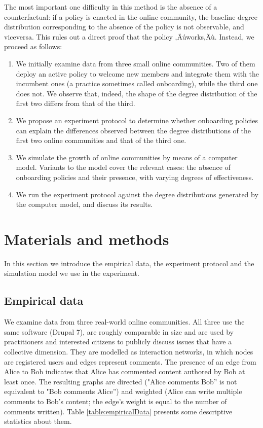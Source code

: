 \documentclass{nws}
\begin{document}
The most important one difficulty in this method is the absence of a counterfactual: if a policy is enacted in the online community, the baseline degree distribution corresponding to the absence of the policy is not observable, and viceversa. This rules out a direct proof that the policy ‚Äúworks‚Äù. Instead, we proceed as follows: 

\begin{enumerate}
\item We initially examine data from three small online communities. Two of them deploy an active policy to welcome new members and integrate them with the incumbent ones (a practice sometimes called onboarding), while the third one does not. We observe that, indeed, the shape of the degree distribution of the first two differs from that of the third.  
\item We propose an experiment protocol to determine whether onboarding policies can explain the differences observed between the degree distributions of the first two online communities and that of the third one. 
\item We simulate the growth of online communities by means of a computer model. Variants to the model cover the relevant cases: the absence of onboarding policies and their presence, with varying degrees of effectiveness. 
\item We run the experiment protocol against the degree distributions generated by the computer model, and discuss its results.
\end{enumerate}

\section{Materials and methods}

In this section we introduce the empirical data, the experiment protocol and the simulation model we use in the experiment. 

\subsection{Empirical data}
\label{sec:empirical_data}

We examine data from three real-world online communities. All three use the same software (Drupal 7), are roughly comparable in size and are used by practitioners and interested citizens to publicly discuss issues that have a collective dimension. They are modelled as interaction networks, in which nodes are registered users and edges represent comments. The presence of an edge from Alice to Bob indicates that Alice has commented content authored by Bob at least once. The resulting graphs are directed ("Alice comments Bob'' is not equivalent to "Bob comments Alice'') and weighted (Alice can write multiple comments to Bob's content; the edge's weight is equal to the number of comments written). Table \ref{table:empiricalData} presents some descriptive statistics about them. 
\end{document}
